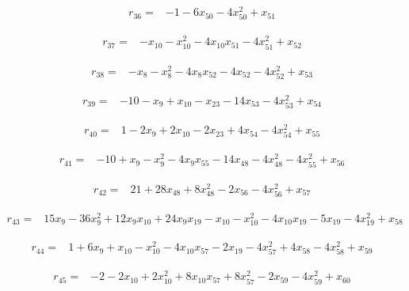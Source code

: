 \begin{align*}
r_{36}={}&-1-6x_{50}-4x_{50}^{2}+x_{51}
\end{align*}

\begin{align*}
r_{37}={}&-x_{10}-x_{10}^{2}-4x_{10}x_{51}-4x_{51}^{2}+x_{52}
\end{align*}

\begin{align*}
r_{38}={}&-x_{8}-x_{8}^{2}-4x_{8}x_{52}-4x_{52}-4x_{52}^{2}+x_{53}
\end{align*}

\begin{align*}
r_{39}={}&-10-x_{9}+x_{10}-x_{23}-14x_{53}-4x_{53}^{2}+x_{54}
\end{align*}

\begin{align*}
r_{40}={}&1-2x_{9}+2x_{10}-2x_{23}+4x_{54}-4x_{54}^{2}+x_{55}
\end{align*}

\begin{align*}
r_{41}={}&-10+x_{9}-x_{9}^{2}-4x_{9}x_{55}-14x_{48}-4x_{48}^{2}-4x_{55}^{2}+x_{56}
\end{align*}

\begin{align*}
r_{42}={}&21+28x_{48}+8x_{48}^{2}-2x_{56}-4x_{56}^{2}+x_{57}
\end{align*}

\begin{align*}
r_{43}={}&15x_{9}-36x_{9}^{2}+12x_{9}x_{10}+24x_{9}x_{19}-x_{10}-x_{10}^{2}-4x_{10}x_{19}-5x_{19}-4x_{19}^{2}+x_{58}
\end{align*}

\begin{align*}
r_{44}={}&1+6x_{9}+x_{10}-x_{10}^{2}-4x_{10}x_{57}-2x_{19}-4x_{57}^{2}+4x_{58}-4x_{58}^{2}+x_{59}
\end{align*}

\begin{align*}
r_{45}={}&-2-2x_{10}+2x_{10}^{2}+8x_{10}x_{57}+8x_{57}^{2}-2x_{59}-4x_{59}^{2}+x_{60}
\end{align*}

